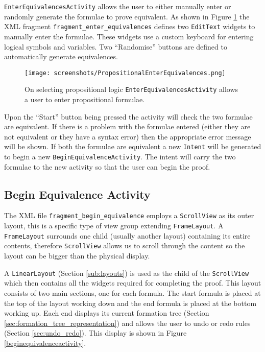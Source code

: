 \documentclass{report}
\begin{document}
{\tt EnterEquivalencesActivity} allows the user to either manually enter or randomly generate the formulae to prove equivalent. As shown in Figure \ref{propositionalenterequivalences} the XML fragment {\tt fragment\_enter\_equivalences} defines two {\tt EditText} widgets to manually enter the formulae. These widgets use a custom keyboard for entering logical symbols and variables. Two ``Randomise'' buttons are defined to automatically generate equivalences.

\begin{figure}[ht!]
    \centering
    \texttt{[image: screenshots/PropositionalEnterEquivalences.png]}
    \caption{On selecting propositional logic {\tt EnterEquivalencesActivity} allows a user to enter propositional formulae.}
    \label{propositionalenterequivalences}
\end{figure}

Upon the ``Start'' button being pressed the activity will check the two formulae are equivalent. If there is a problem with the formulae entered (either they are not equivalent or they have a syntax error) then the appropriate error message will be shown. If both the formulae are equivalent a new {\tt Intent} will be generated to begin a new {\tt BeginEquivalenceActivity}. The intent will carry the two formulae to the new activity so that the user can begin the proof.

\subsection{Begin Equivalence Activity}

The XML file {\tt fragment\_begin\_equivalence} employs a {\tt ScrollView} as its outer layout, this is a specific type of view group extending {\tt FrameLayout}. A {\tt FrameLayout} surrounds one child (usually another layout) containing its entire contents, therefore {\tt ScrollView} allows us to scroll through the content so the layout can be bigger than the physical display. 

A {\tt LinearLayout} (Section \ref{sub:layouts}) is used as the child of the {\tt ScrollView} which then contains all the widgets required for completing the proof. This layout consists of two main sections, one for each formula. The start formula is placed at the top of the layout working down and the end formula is placed at the bottom working up. Each end displays its current formation tree (Section \ref{sec:formation_tree_representation}) and allows the user to undo or redo rules (Section \ref{sec:undo_redo}). This display is shown in Figure \ref{beginequivalenceactivity}.
\end{document}
